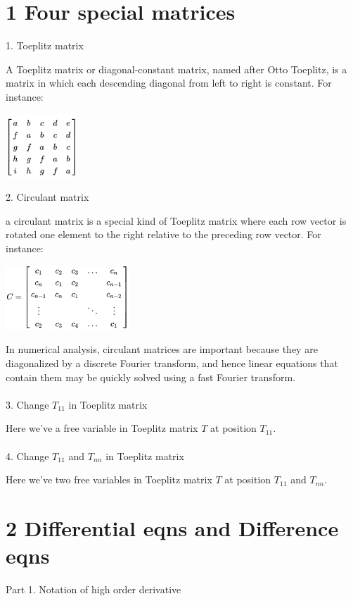 \documentclass{article}
\begin{document}
\begin{spacing}{1.5}
\section*{1 Four special matrices}
1. Toeplitz matrix

A Toeplitz matrix or diagonal-constant matrix, named after Otto Toeplitz, is a matrix in which each descending diagonal from left to right is constant. For instance:
\\\begin{center}
	\includegraphics[width=0.2\textwidth]{Toeplitz_matrix1.png} \\ 
\end{center}
2. Circulant matrix

a circulant matrix is a special kind of Toeplitz matrix where each row vector is rotated one element to the right relative to the preceding row vector. For instance:
\\\begin{center}
	\includegraphics[width=0.35\textwidth]{circulant_matrix.png}
\end{center}

In numerical analysis, circulant matrices are important because they are diagonalized by a discrete Fourier transform, and hence linear equations that contain them may be quickly solved using a fast Fourier transform.
\\\\3. Change $T_{11}$ in Toeplitz matrix

Here we've a free variable in Toeplitz matrix $T$ at position $T_{11}$.
\\\\4. Change $T_{11}$ and $T_{nn}$ in Toeplitz matrix

Here we've two free variables in Toeplitz matrix $T$ at position $T_{11}$ and $T_{nn}$.


\section*{2 Differential eqns and Difference eqns}
Part 1. Notation of high order derivative


\end{spacing}
\end{document}
